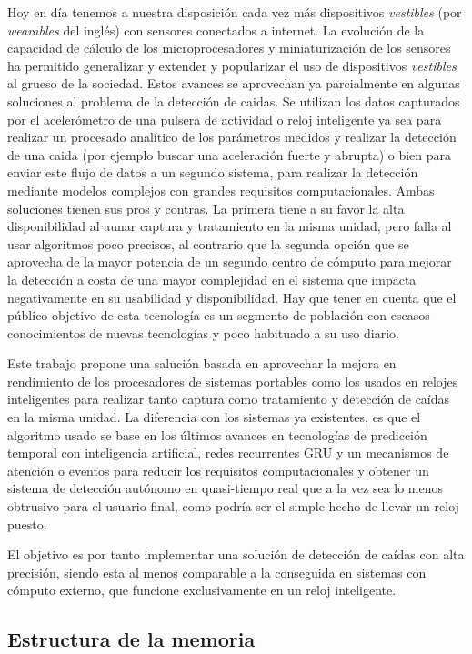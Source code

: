 \documentclass[../tfm.tex]{subfiles}
\begin{document}
Hoy en día tenemos a nuestra disposición cada vez más dispositivos \textit{vestibles} (por \textit{wearables} del inglés) con sensores conectados a internet. La evolución de la capacidad de cálculo de los microprocesadores y miniaturización de los sensores ha permitido generalizar y extender y popularizar el uso de dispositivos \textit{vestibles} al grueso de la sociedad. Estos avances se aprovechan ya parcialmente en algunas soluciones al problema de la detección de caidas. Se utilizan los datos capturados por el acelerómetro de una pulsera de actividad o reloj inteligente ya sea para realizar un procesado analítico de los parámetros medidos y realizar la detección de una caida (por ejemplo buscar una aceleración fuerte y abrupta) o bien para enviar este flujo de datos a un segundo sistema, para realizar la detección mediante modelos complejos con grandes requisitos computacionales. Ambas soluciones tienen sus pros y contras. La primera tiene a su favor la alta disponibilidad al aunar captura y tratamiento en la misma unidad, pero falla al usar algoritmos poco precisos, al contrario que la segunda opción que se aprovecha de la mayor potencia de un segundo centro de cómputo para mejorar la detección a costa de una mayor complejidad en el sistema que impacta negativamente en su usabilidad y disponibilidad. Hay que tener en cuenta que el público objetivo de esta tecnología es un segmento de población con escasos conocimientos de nuevas tecnologías y poco habituado a su uso diario.

Este trabajo propone una salución basada en aprovechar la mejora en rendimiento de los procesadores de sistemas portables como los usados en relojes inteligentes para realizar tanto captura como tratamiento y detección de caídas en la misma unidad. La diferencia con los sistemas ya existentes, es que el algoritmo usado se base en los últimos avances en tecnologías de predicción temporal con inteligencia artificial, redes recurrentes GRU y un mecanismos de atención o eventos para reducir los requisitos computacionales y obtener  un sistema de detección autónomo en quasi-tiempo real que a la vez sea lo menos obtrusivo para el usuario final, como podría ser el simple hecho de llevar un reloj puesto.

El objetivo es por tanto implementar una solución de detección de caídas con alta precisión, siendo esta al menos comparable a la conseguida en sistemas con cómputo externo, que funcione exclusivamente en un reloj inteligente.


\subsection{Estructura de la memoria}
\end{document}
